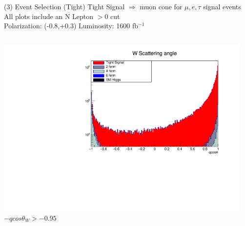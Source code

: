 \documentclass[10pt]{beamer}
\begin{document}
\begin{frame}{(3) Event Selection (Tight)}
\scriptsize
Tight Signal $\Rightarrow$  muon cone for $\mu,e,\tau$ signal events\\
All plots include an N Lepton $> 0$ cut\\
Polarization: (-0.8,+0.3)\quad
Luminosity: 1600 fb$^{-1}$\\
\begin{columns}
\begin{column}{0.5\textwidth}
\includegraphics[scale=0.3, left]{qcostHist.pdf} \\
$-qcos\theta_W > -0.95$
\end{column}
\begin{column}{0.5\textwidth}

\end{column}
\end{columns}
\end{frame}
\end{document}
